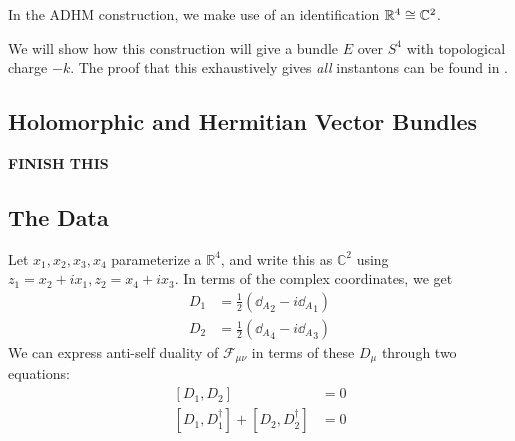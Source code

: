 	In the ADHM construction, we make use of an identification $\mathbb{R}^4 \cong \mathbb{C}^2$. 
	
	We will show how this construction will give a bundle $E$ over $S^4$ with topological charge $-k$. The proof that this exhaustively gives \emph{all} instantons can be found in \cite{donaldson1988}.
	
	\subsection{Holomorphic and Hermitian Vector Bundles} %
	\label{sub:holomorphic_and_hermitian_vector_bundles}
	
	\textbf{FINISH THIS}
	
	
	\subsection{The Data}
	
	Let $x_1, x_2, x_3, x_4$ parameterize a $\mathbb R^4$, and write this as $\mathbb C^2$ using $z_1 = x_2 + i x_1, z_2 = x_4 + i x_3$. In terms of the complex coordinates, we get
	\begin{equation}
		\begin{aligned}
			D_1 &= \frac{1}{2} ({\dd_A}_2 - i {\dd_A}_1)\\
			D_2 &= \frac{1}{2} ({\dd_A}_4 - i {\dd_A}_3)
		\end{aligned}
	\end{equation}
	We can express anti-self duality of $\mathcal F_{\mu \nu}$ in terms of these $D_\mu$ through two equations:
	\begin{equation}
		\begin{aligned}
			\left[ D_1, D_2 \right] &= 0\\
			[D_1, D_1^\dagger] + [D_2, D_2^\dagger] &= 0
		\end{aligned}
	\end{equation}
	
	
